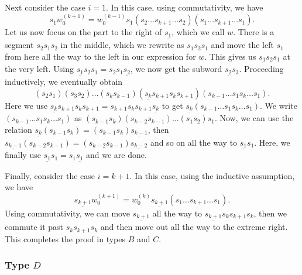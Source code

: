\documentclass[a4paper]{amsart}
\begin{document}
Next consider the case $i=1$. In this case, using commutativity, we have
\begin{displaymath}
\underline{s_1}w_0^{(k+1)}=
w_0^{(k-1)}\underline{s_1}(s_2\dots s_{k+1}\dots s_2)(s_1\dots s_{k+1}\dots s_1).
\end{displaymath}
Let us now focus on the part to the right of $\underline{s_1}$, 
which we call $w$. There is
a segment $s_2s_1s_2$ in the middle, which we rewrite as $s_1s_2s_1$ and move
the left $s_1$ from here all the way to the left in our expression
for $w$. This gives us $\underline{s_1}s_2s_1$ at the very left.
Using $\underline{s_1}s_2s_1=s_2s_1\underline{s_2}$, we now get the
subword $\underline{s_2}s_3$. Proceeding inductively, we eventually obtain
\begin{displaymath}
(s_2s_1)(s_3s_2)\dots (s_ks_{k-1})
(\underline{s_k}s_{k+1}s_ks_{k+1})(s_{k-1}\dots s_1s_k\dots s_1).
\end{displaymath}
Here we use $\underline{s_k}s_{k+1}s_ks_{k+1}=s_{k+1}s_ks_{k+1}\underline{s_k}$
to get $\underline{s_k}(s_{k-1}\dots s_1s_k\dots s_1)$. We write
$(s_{k-1}\dots s_1s_k\dots s_1)$ as 
$(s_{k-1}s_k)(s_{k-2}s_{k-1})\dots (s_1s_2)s_1$.
Now, we can use the relation
$\underline{s_k}(s_{k-1}s_k)=(s_{k-1}s_k)\underline{s_{k-1}}$,
then $\underline{s_{k-1}}(s_{k-2}s_{k-1})=(s_{k-2}s_{k-1})\underline{s_{k-2}}$
and so on all the way to $\underline{s_{1}}s_1$. Here, we finally use
$\underline{s_{1}}s_1=s_1\underline{s_{1}}$ and we are done.

Finally, consider the case $i=k+1$. In this case, using the inductive
assumption, we have
\begin{displaymath}
\underline{s_{k+1}}w_0^{(k+1)}=
w_0^{(k)}\underline{s_{k+1}}(s_1\dots s_{k+1}\dots s_1).
\end{displaymath}
Using commutativity, we can move $\underline{s_{k+1}}$ all the way to
$\underline{s_{k+1}}s_{k}s_{k+1}s_{k}$, then we commute it past
$s_{k}s_{k+1}s_{k}$ and then move out all the way to the extreme right.
This completes the proof in types $B$ and $C$.

\subsubsection{\bf Type $D$}\label{s5.2.3}
\end{document}

